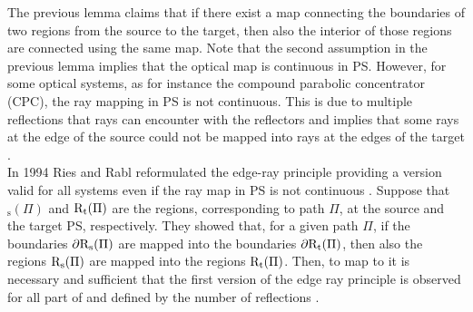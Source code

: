 The previous lemma claims that if there exist a map connecting the boundaries of two regions from the source to the target, then also the interior of those regions are connected using the same map. Note that the second assumption in the previous lemma implies that the optical map is continuous in PS.
However, for some optical systems, as for instance the compound parabolic concentrator (CPC), the ray mapping in PS is not continuous. This is due to multiple reflections that rays can encounter with the reflectors and implies that some rays at the edge of the source could not be mapped into rays at the edges of the target \cite{davies1994edge}. \\ \indent 
In 1994 Ries and Rabl reformulated the edge-ray principle providing a version valid for all systems even if the ray map in PS is not continuous \cite{Ries:2}. 
Suppose that $_\textrm{s}(\Pi)$ and $\mbox{$\textup{R}$}_\textrm{t}(\Pi)$ are the regions, corresponding to path $\Pi$, at the source and the target PS, respectively. 
They showed that, for a given path $\Pi$, if the boundaries
$\partial\mbox{$\textup{R}$}_\textrm{s}(\Pi)$ are mapped into the boundaries $\partial\mbox{$\textup{R}$}_\textrm{t}(\Pi)$, then also the regions $\mbox{$\textup{R}$}_\textrm{s}(\Pi)$ are mapped into the regions $\mbox{$\textup{R}$}_\textrm{t}(\Pi)$.
Then, to map  to  it is necessary and sufficient that the first version of the edge ray principle is observed for all part of  and  defined by the number of reflections \cite{Ries:2}. 
